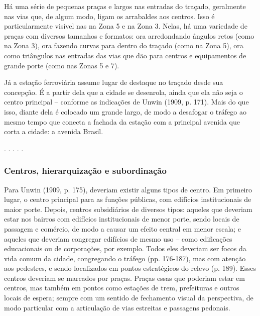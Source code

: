\documentclass[12pt, a4paper]{book} %
\begin{document}
        Há uma série de pequenas praças e largos nas entradas do traçado, geralmente nas vias que, de algum modo, ligam os arrabaldes aos centros. Isso é particularmente visível nas na Zona 5 e na Zona 3. Nelas, há uma variedade de praças com diversos tamanhos e formatos: ora arredondando ângulos retos (como na Zona 3), ora fazendo curvas para dentro do traçado (como na Zona 5), ora como triângulos nas entradas das vias que dão para centros e equipamentos de grande porte (como nas Zonas 5 e 7).

        Já a estação ferroviária assume lugar de destaque no traçado desde sua concepção. É a partir dela que a cidade se desenrola, ainda que ela não seja o centro principal – conforme as indicações de Unwin (1909, p. 171). Mais do que isso, diante dela é colocado um grande largo, de modo a desafogar o tráfego ao mesmo tempo que conecta a fachada da estação com a principal avenida que corta a cidade: a avenida Brasil.

        \begin{center}
            . . . . .
        \end{center} 

                \subsubsection*{Centros, hierarquização e subordinação}

        Para Unwin (1909, p. 175), deveriam existir alguns tipos de centro. Em primeiro lugar, o centro principal para as funções públicas, com edifícios institucionais de maior porte. Depois, centros subsidiários de diversos tipos: aqueles que deveriam estar nos bairros com edifícios institucionais de menor porte, sendo locais de passagem e comércio, de modo a causar um efeito central em menor escala; e aqueles que deveriam congregar edifícios de mesmo uso – como edificações educacionais ou de corporações, por exemplo. Todos eles deveriam ser focos da vida comum da cidade, congregando o tráfego (pp. 176-187), mas com atenção aos pedestres, e sendo localizados em pontos estratégicos do relevo (p. 189). Esses centros deveriam se marcados por praças. Praças essas que poderiam estar em centros, mas também em pontos como estações de trem, prefeituras e outros locais de espera; sempre com um sentido de fechamento visual da perspectiva, de modo particular com a articulação de vias estreitas e passagens pedonais.
\end{document}
